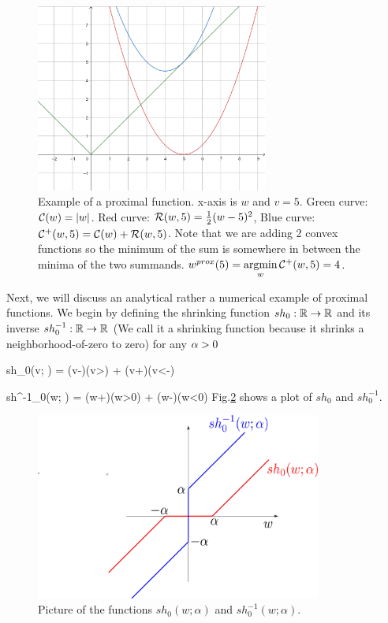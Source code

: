 \begin{figure}[h!]
\centering
\includegraphics[width=3in]
{regularization/proximal-example.png}
\caption{Example of a proximal
function. x-axis is $w$ and $v=5$. Green curve: ${\cal C}(w)=|w|$. Red curve: ${\cal R}(w, 5)=\frac{1}{2}(w-5)^2$, Blue curve: ${\cal C}^+(w, 5)={\cal C}(w)+{\cal R}(w,5)$. Note that we are adding 2 convex functions so the minimum of the sum is somewhere in between the minima of the two summands.
$w^{prox}(5) =\mathop{\mathrm{argmin}}\limits_w
{\cal C}^+(w, 5)=4$.
}
\label{fig-proximal-example}
\end{figure}

Next, we will discuss an
analytical rather a numerical
example of proximal functions.
We  begin by defining the
shrinking function $sh_0: { \mathbb{R}}\rightarrow { \mathbb{R}}$ and its inverse
$sh_0^{-1}:{ \mathbb{R}}\rightarrow{ \mathbb{R}}$ (We call it a
shrinking function because
it shrinks a neighborhood-of-zero to zero) for any $\alpha>0$

\beq
sh_0(v; \alp) = (v-\alp)\indi(v>\alp) + (v+\alp)\indi(v<-\alp)
\eeq

\beq
sh^{-1}_0(w; \alp) = (w+\alp)\indi(w>0) + (w-\alp)\indi(w<0)
\eeq
Fig.\ref{fig-sh_0_w}
shows a plot of $sh_0$ and
$sh^{-1}_0$.


\begin{figure}[h!]
\centering
\includegraphics[width=3.7in]
{regularization/sh_0_w.png}
\caption{Picture
of the functions $sh_0(w; \alpha)$ and $sh_0^{-1}(w; \alpha)$.
}
\label{fig-sh_0_w}
\end{figure}

